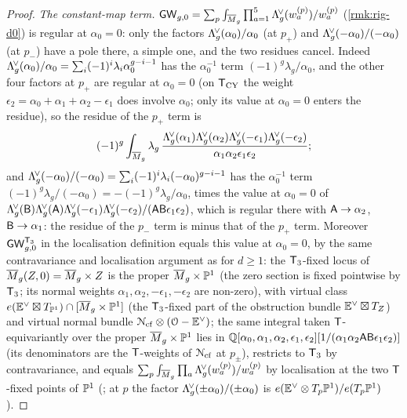 \begin{proof}
\emph{The constant-map term.} $\mathsf{GW}_{g,0}=\sum_p\int_{\overline{M}_g}\prod_{a=1}^5\Lambda^{\!\vee}_g(w^{(p)}_a)/w^{(p)}_a$ (\cref{rmk:rig-d0}) is regular at $\alpha_0=0$: only the factors $\Lambda^{\!\vee}_g(\alpha_0)/\alpha_0$ (at $p_+$) and $\Lambda^{\!\vee}_g(-\alpha_0)/(-\alpha_0)$ (at $p_-$) have a pole there, a simple one, and the two residues cancel. Indeed $\Lambda^{\!\vee}_g(\alpha_0)/\alpha_0=\sum_i(-1)^i\lambda_i\alpha_0^{g-i-1}$ has the $\alpha_0^{-1}$ term $(-1)^g\lambda_g/\alpha_0$, and the other four factors at $p_+$ are regular at $\alpha_0=0$ (on $\mathsf{T}_{\mathrm{CY}}$ the weight $\epsilon_2=\alpha_0+\alpha_1+\alpha_2-\epsilon_1$ does involve $\alpha_0$; only its value at $\alpha_0=0$ enters the residue), so the residue of the $p_+$ term is
\[
(-1)^g\int_{\overline{M}_g}\lambda_g\,\frac{\Lambda^{\!\vee}_g(\alpha_1)\Lambda^{\!\vee}_g(\alpha_2)\Lambda^{\!\vee}_g(-\epsilon_1)\Lambda^{\!\vee}_g(-\epsilon_2)}{\alpha_1\alpha_2\epsilon_1\epsilon_2};
\]
and $\Lambda^{\!\vee}_g(-\alpha_0)/(-\alpha_0)=\sum_i(-1)^i\lambda_i(-\alpha_0)^{g-i-1}$ has the $\alpha_0^{-1}$ term $(-1)^g\lambda_g/(-\alpha_0)=-(-1)^g\lambda_g/\alpha_0$, times the value at $\alpha_0=0$ of $\Lambda^{\!\vee}_g(\mathsf{B})\Lambda^{\!\vee}_g(\mathsf{A})\Lambda^{\!\vee}_g(-\epsilon_1)\Lambda^{\!\vee}_g(-\epsilon_2)/(\mathsf{A}\mathsf{B}\epsilon_1\epsilon_2)$, which is regular there with $\mathsf{A}\to\alpha_2$, $\mathsf{B}\to\alpha_1$: the residue of the $p_-$ term is minus that of the $p_+$ term. Moreover $\mathsf{GW}^{\mathsf{T}_{3}}_{g,0}$ in the localisation definition equals this value at $\alpha_0=0$, by the same contravariance and localisation argument as for $d\geq 1$: the $\mathsf{T}_{3}$-fixed locus of $\overline{M}_g(Z,0)=\overline{M}_g\times Z$ is the proper $\overline{M}_g\times\mathbb{P}^1$ (the zero section is fixed pointwise by $\mathsf{T}_{3}$; its normal weights $\alpha_1,\alpha_2,-\epsilon_1,-\epsilon_2$ are non-zero), with virtual class $e(\mathbb{E}^\vee\boxtimes T_{\mathbb{P}^1})\cap[\overline{M}_g\times\mathbb{P}^1]$ (the $\mathsf{T}_{3}$-fixed part of the obstruction bundle $\mathbb{E}^\vee\boxtimes T_Z$) and virtual normal bundle $\mathcal{N}_{\mathrm{cf}}\otimes(\mathcal{O}-\mathbb{E}^\vee)$; the same integral taken $\mathsf{T}$-equivariantly over the proper $\overline{M}_g\times\mathbb{P}^1$ lies in $\mathbb{Q}[\alpha_0,\alpha_1,\alpha_2,\epsilon_1,\epsilon_2][1/(\alpha_1\alpha_2\mathsf{A}\mathsf{B}\epsilon_1\epsilon_2)]$ (its denominators are the $\mathsf{T}$-weights of $\mathcal{N}_{\mathrm{cf}}$ at $p_\pm$), restricts to $\mathsf{T}_{3}$ by contravariance, and equals $\sum_p\int_{\overline{M}_g}\prod_a\Lambda^{\!\vee}_g(w^{(p)}_a)/w^{(p)}_a$ by localisation at the two $\mathsf{T}$-fixed points of $\mathbb{P}^1$ (\cite{GP99}; at $p$ the factor $\Lambda^{\!\vee}_g(\pm\alpha_0)/(\pm\alpha_0)$ is $e(\mathbb{E}^\vee\otimes T_p\mathbb{P}^1)/e(T_p\mathbb{P}^1)$).


\end{proof}
